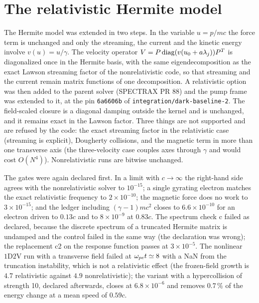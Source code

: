 \section{The relativistic Hermite model}\label{sec:c10-herm}


The Hermite model was extended in two steps. In the variable $u=p/mc$ the force term is unchanged and only the streaming, the current and the kinetic energy involve $v(u)=u/\gamma$. The velocity operator $V=P\,{\rm diag}(v(u_0+a\lambda_j))P^T$ is diagonalized once in the Hermite basis, with the same eigendecomposition as the exact Lawson streaming factor of the nonrelativistic code, so that streaming and the current remain matrix functions of one decomposition. A relativistic option was then added to the parent solver (SPECTRAX PR 88) and the pump frame was extended to it, at the pin \texttt{6a6606b} of \texttt{integration/dark-baseline-2}. The field-scaled closure is a diagonal damping outside the kernel and is unchanged, and it remains exact in the Lawson factor. Three things are not supported and are refused by the code: the exact streaming factor in the relativistic case (streaming is explicit), Dougherty collisions, and the magnetic term in more than one transverse axis (the three-velocity case couples axes through $\gamma$ and would cost $O(N^4)$). Nonrelativistic runs are bitwise unchanged.

The gates were again declared first. In a limit with $c\to\infty$ the right-hand side agrees with the nonrelativistic solver to $10^{-15}$; a single gyrating electron matches the exact relativistic frequency to $2\times10^{-10}$; the magnetic force does no work to $3\times10^{-15}$; and the ledger including $(\gamma-1)mc^2$ closes to $6.6\times10^{-10}$ for an electron driven to $0.13c$ and to $8\times10^{-9}$ at $0.83c$. The spectrum check c failed as declared, because the discrete spectrum of a truncated Hermite matrix is undamped and the control failed in the same way (the declaration was wrong); the replacement c2 on the response function passes at $3\times10^{-5}$. The nonlinear $1\mathrm{D}2\mathrm{V}$ run with a transverse field failed at $\omega_{pe} t\simeq8$ with a NaN from the truncation instability, which is not a relativistic effect (the frozen-field growth is $4.7$ relativistic against $4.9$ nonrelativistic); the variant with a hypercollision of strength 10, declared afterwards, closes at $6.8\times10^{-6}$ and removes $0.7\,\%$ of the energy change at a mean speed of $0.59c$.

